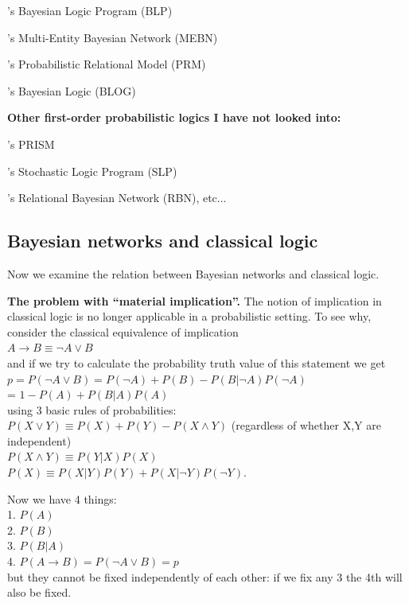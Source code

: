 \citep*{Kersting2000}'s Bayesian Logic Program (BLP)

\citep*{Laskey2006}'s Multi-Entity Bayesian Network (MEBN)

\citep*{Getoor2007a}'s Probabilistic Relational Model (PRM)

\citep*{Milch2007}'s Bayesian Logic (BLOG)

{\bfseries Other first-order probabilistic logics I have not looked into:}

\citep*{Sato1997}'s PRISM

\citep*{Muggleton1996}'s Stochastic Logic Program (SLP)

\citep*{Jaeger1997}'s Relational Bayesian Network (RBN), etc...

\subsection{Bayesian networks and classical logic}
\label{sec:P-and-ClassicalLogic}

Now we examine the relation between Bayesian networks and classical logic.

\textbf{The problem with ``material implication''.}  The notion of implication in classical logic is no longer applicable in a probabilistic setting.  To see why, consider the classical equivalence of implication\\
\hspace*{1cm} $ A \rightarrow B \equiv \neg A \vee B $\\
and if we try to calculate the probability truth value of this statement we get\\
\hspace*{1cm} $ p = P( \neg A \vee B ) = P(\neg A) + P(B) - P(B|\neg A) P(\neg A) $\\
\hspace*{1cm} = $ 1 - P(A) + P(B|A) P(A) $\\
using 3 basic rules of probabilities:\\
\hspace*{1cm} $ P(X \vee Y) \equiv P(X) + P(Y) - P(X \wedge Y) $  (regardless of whether X,Y are independent)\\
\hspace*{1cm} $ P(X \wedge Y) \equiv P(Y|X)P(X) $\\
\hspace*{1cm} $ P(X) \equiv P(X|Y)P(Y) + P(X|\neg Y)P(\neg Y) $.

Now we have 4 things:\\
\hspace*{1cm} 1.  $ P(A) $\\
\hspace*{1cm} 2.  $ P(B) $\\ 
\hspace*{1cm} 3.  $ P(B|A) $\\
\hspace*{1cm} 4.  $ P(A \rightarrow B) = P(\neg A \vee B) = p $\\
but they cannot be fixed independently of each other: if we fix any 3 the 4th will also be fixed.

